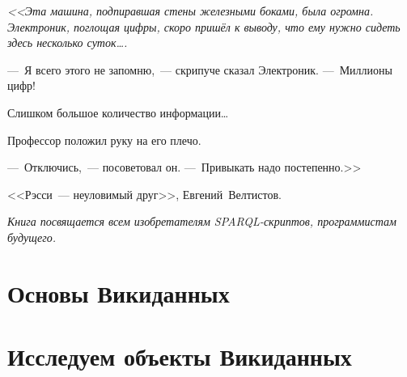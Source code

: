 \documentclass[nofonts,justified,nobib]{tufte-book}%
\theoremstyle{definition}
\begin{document}
\begin{fullwidth}
\begin{doublespace}
\noindent\fontsize{18}{22}\selectfont\itshape
<<Эта машина, подпиравшая стены железными боками, была огромна. 
Электроник, поглощая цифры, скоро пришёл к выводу, что ему нужно сидеть здесь несколько суток\dots.

---~Я всего этого не запомню,~--- скрипуче сказал Электроник. ---~Миллионы цифр!

Слишком большое количество информации\dots

Профессор положил руку на его плечо.

---~Отключись,~--- посоветовал он. ---~Привыкать надо постепенно.>>

<<Рэсси~--- неуловимый друг>>, \mbox{Евгений Велтистов}.
\end{doublespace}
\end{fullwidth}


\begin{fullwidth}
\begin{doublespace}
\noindent\fontsize{18}{22}\selectfont\itshape
\nohyphenation
Книга посвящается всем изобретателям SPARQL-скриптов, 
    программистам будущего.
\end{doublespace}
\end{fullwidth}


\cleardoublepage



\mainmatter

\part{Основы Викиданных}





%




\part{Исследуем объекты Викиданных}








%




\end{document}
